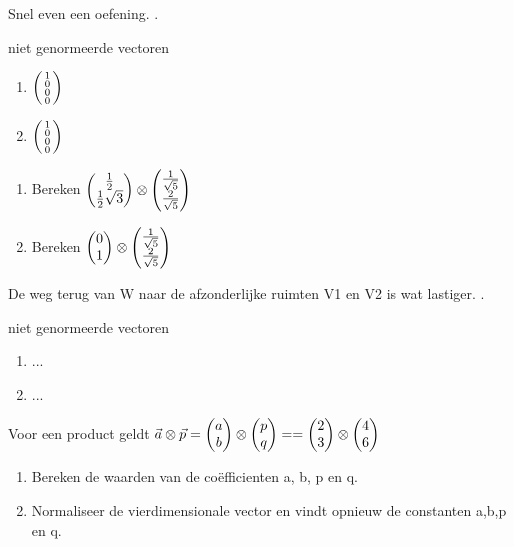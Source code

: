 \documentclass[../main.tex]{subfiles}
\begin{document}
\begin{mdframed}[style=wiskader,frametitle={Matrixen}]
Snel even een oefening. .

\begin{antwoord}
niet genormeerde vectoren
\begin{enumerate}
  \item $\smqty(1\\0\\0\\0)$
  \item $\smqty(1\\0\\0\\0)$
\end{enumerate}
\end{antwoord}
\begin{opdracht}
\begin{enumerate}
\item Bereken $\mqty(\tfrac{1}{2} \\ \tfrac{1}{2}\sqrt{3}) \otimes \mqty(\tfrac{1}{\sqrt{5}} \\ \tfrac{2}{\sqrt{5}})$
\item Bereken $\mqty(0\\1) \otimes \mqty(\tfrac{1}{\sqrt{5}} \\ \tfrac{2}{\sqrt{5}})$
\end{enumerate}
\end{opdracht}

De weg terug van W naar de afzonderlijke ruimten V1 en V2 is wat lastiger. .

\begin{antwoord}
niet genormeerde vectoren
\begin{enumerate}
  \item $...$
  \item $...$
\end{enumerate}
\end{antwoord}
\begin{opdracht}
Voor een product geldt $\vect{a} \otimes \vect{p} =\mqty(a\\b) \otimes \mqty(p\\q)==\mqty(2\\3) \otimes \mqty(4\\6)$
\begin{enumerate}
\item Bereken de waarden van de co\"efficienten a, b, p en q. 
\item Normaliseer de vierdimensionale vector en vindt opnieuw de constanten a,b,p en q. 
\end{enumerate}
\end{opdracht}


\end{mdframed}
\end{document}
